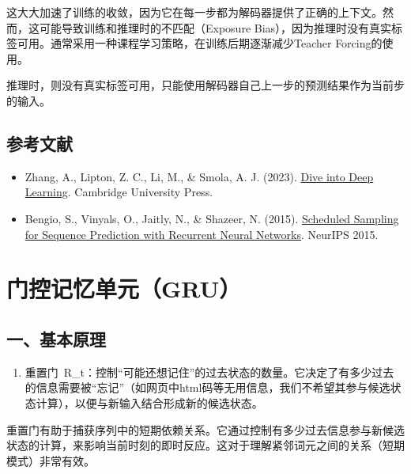 这大大加速了训练的收敛，因为它在每一步都为解码器提供了正确的上下文。然而，这可能导致训练和推理时的不匹配（Exposure Bias），因为推理时没有真实标签可用。通常采用一种课程学习策略，在训练后期逐渐减少Teacher Forcing的使用。

推理时，则没有真实标签可用，只能使用解码器自己上一步的预测结果作为当前步的输入。

\hypertarget{ux53c2ux8003ux6587ux732e-19}{%
\subsection{参考文献}\label{ux53c2ux8003ux6587ux732e-19}}

\vspace{0.25em}
\begin{itemize}
\tightlist
\item
  Zhang, A., Lipton, Z. C., Li, M., \& Smola, A. J. (2023). \href{https://D2L.ai}{Dive into Deep Learning}. Cambridge University Press.
\item
  Bengio, S., Vinyals, O., Jaitly, N., \& Shazeer, N. (2015). \href{https://proceedings.neurips.cc/paper/2015/hash/e995f98d56967d946471af29d7bf99f1-Abstract.html}{Scheduled Sampling for Sequence Prediction with Recurrent Neural Networks}. NeurIPS 2015.
\end{itemize}

\clearpage

\hypertarget{ux95e8ux63a7ux8bb0ux5fc6ux5355ux5143gru}{%
\section{门控记忆单元（GRU）}\label{ux95e8ux63a7ux8bb0ux5fc6ux5355ux5143gru}}

\hypertarget{ux4e00ux57faux672cux539fux7406}{%
\subsection{一、基本原理}\label{ux4e00ux57faux672cux539fux7406}}

\begin{enumerate}
\def\labelenumi{\arabic{enumi}.}
\tightlist
\item
  重置门~R\_t：控制``可能还想记住''的过去状态的数量。它决定了有多少过去的信息需要被``忘记''（如网页中html码等无用信息，我们不希望其参与候选状态计算），以便与新输入结合形成新的候选状态。
\end{enumerate}

重置门有助于捕获序列中的短期依赖关系。它通过控制有多少过去信息参与新候选状态的计算，来影响当前时刻的即时反应。这对于理解紧邻词元之间的关系（短期模式）非常有效。

